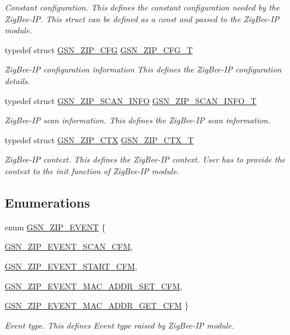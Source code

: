 \begin{DoxyCompactItemize}
\begin{DoxyCompactList}\small\item\em Constant configuration. This defines the constant configuration needed by the ZigBee-\/IP. This struct can be defined as a const and passed to the ZigBee-\/IP module. \end{DoxyCompactList}\item 
typedef struct \hyperlink{a00438}{GSN\_\-ZIP\_\-CFG} \hyperlink{a00618_a56f802e85cf43a69e675b750a87f9c2c}{GSN\_\-ZIP\_\-CFG\_\-T}
\begin{DoxyCompactList}\small\item\em ZigBee-\/IP configuration information This defines the ZigBee-\/IP configuration details. \end{DoxyCompactList}\item 
typedef struct \hyperlink{a00442}{GSN\_\-ZIP\_\-SCAN\_\-INFO} \hyperlink{a00618_adc2498c7409e8d5e710cfc014e9b84cf}{GSN\_\-ZIP\_\-SCAN\_\-INFO\_\-T}
\begin{DoxyCompactList}\small\item\em ZigBee-\/IP scan information. This defines the ZigBee-\/IP scan information. \end{DoxyCompactList}\item 
typedef struct \hyperlink{a00440}{GSN\_\-ZIP\_\-CTX} \hyperlink{a00618_aa7ad02729e7d464fd05afdcc923ff390}{GSN\_\-ZIP\_\-CTX\_\-T}
\begin{DoxyCompactList}\small\item\em ZigBee-\/IP context. This defines the ZigBee-\/IP context. User has to provide the context to the init function of ZigBee-\/IP module. \end{DoxyCompactList}\end{DoxyCompactItemize}
\subsection*{Enumerations}
\begin{DoxyCompactItemize}
\item 
enum \hyperlink{a00618_a6118b093f8c8dfb5596d2971c5c2c698}{GSN\_\-ZIP\_\-EVENT} \{ \par
\hyperlink{a00618_a6118b093f8c8dfb5596d2971c5c2c698a97fe499ff475acce0730be30dc0a6ac5}{GSN\_\-ZIP\_\-EVENT\_\-SCAN\_\-CFM}, 
\par
\hyperlink{a00618_a6118b093f8c8dfb5596d2971c5c2c698ac049dc27dd7a2c93bf740affc81cc343}{GSN\_\-ZIP\_\-EVENT\_\-START\_\-CFM}, 
\par
\hyperlink{a00618_a6118b093f8c8dfb5596d2971c5c2c698acff9840ec9241ed5cbe28abdc1d3e6d3}{GSN\_\-ZIP\_\-EVENT\_\-MAC\_\-ADDR\_\-SET\_\-CFM}, 
\par
\hyperlink{a00618_a6118b093f8c8dfb5596d2971c5c2c698a2308f8259036d89a493adf442f95d2d5}{GSN\_\-ZIP\_\-EVENT\_\-MAC\_\-ADDR\_\-GET\_\-CFM}
 \}
\begin{DoxyCompactList}\small\item\em Event type. This defines Event type raised by ZigBee-\/IP module. \end{DoxyCompactList}\end{DoxyCompactItemize}
